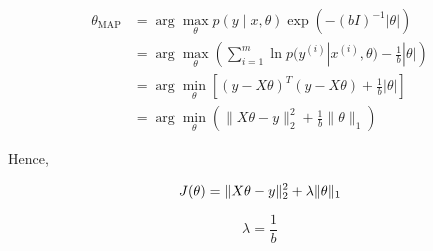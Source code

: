 \begin{answer}
	$$
	\begin{aligned}
		\theta_{\text{MAP}} & = \arg\max_{\theta} p(y\mid x,\theta)\exp(-(bI)^{-1}|\theta|)\\
		& = \arg\max_{\theta} \left(\sum_{i=1}^m \ln p(y^{(i)} | x^{(i)}, \theta) -\frac{1}{b}|\theta|\right)\\
		& = \arg\min_{\theta} \left[(y - X\theta)^T(y - X\theta) + \frac{1}{b}|\theta|\right]\\
		& = \arg\min_{\theta} \left(\|X\theta-y\|_2^2 + \frac{1}{b}\|\theta\|_1\right)
	\end{aligned}
	$$
	
	Hence,
	
	$$
	J(\theta) = \|X\theta-y\|_2^2 + \lambda\|\theta\|_1\\
	$$
	
	$$
	\lambda = \frac{1}{b}
	$$
\end{answer}
